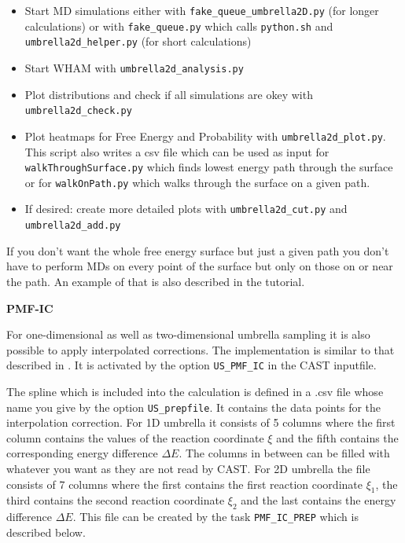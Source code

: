 \documentclass[10pt,a4paper]{article} %
\begin{document}
	\begin{itemize}
		\item Start MD simulations either with \texttt{fake\_queue\_umbrella2D.py} (for longer calculations) or with \texttt{fake\_queue.py} which calls \texttt{python.sh} and \texttt{umbrella2d\_helper.py} (for short calculations)
		\item Start WHAM with \texttt{umbrella2d\_analysis.py}
		\item Plot distributions and check if all simulations are okey with \texttt{umbrella2d\_check.py}
		\item Plot heatmaps for Free Energy and Probability with \texttt{umbrella2d\_plot.py}. This script also writes a csv file which can be used as input for \texttt{walkThroughSurface.py} which finds lowest energy path through the surface or for \texttt{walkOnPath.py} which walks through the surface on a given path.
		\item If desired: create more detailed plots with \texttt{umbrella2d\_cut.py} and \texttt{umbrella2d\_add.py}
	\end{itemize}

    If you don't want the whole free energy surface but just a given path you don't have to perform MDs on every point of the surface but only on those on or near the path. An example of that is also described in the tutorial.
    
    \textbf{PMF-IC}
    
    For one-dimensional as well as two-dimensional umbrella sampling it is also possible to apply interpolated corrections. The implementation is similar to that described in \cite{ruiz-pernia_hybrid_2004}. It is activated by the option \texttt{US\_PMF\_IC} in the CAST inputfile.
    
    The spline which is included into the calculation is defined in a .csv file whose name you give by the option \texttt{US\_prepfile}. It contains the data points for the interpolation correction. For 1D umbrella it consists of 5 columns where the first column contains the values of the reaction coordinate $\xi$ and the fifth contains the corresponding energy difference $\Delta E$. The columns in between can be filled with whatever you want as they are not read by CAST. For 2D umbrella the file consists of 7 columns where the first contains the first reaction coordinate $\xi_1$, the third contains the second reaction coordinate $\xi_2$ and the last contains the energy difference $\Delta E$. This file can be created by the task \texttt{PMF\_IC\_PREP} which is described below. 
    
\end{document}
